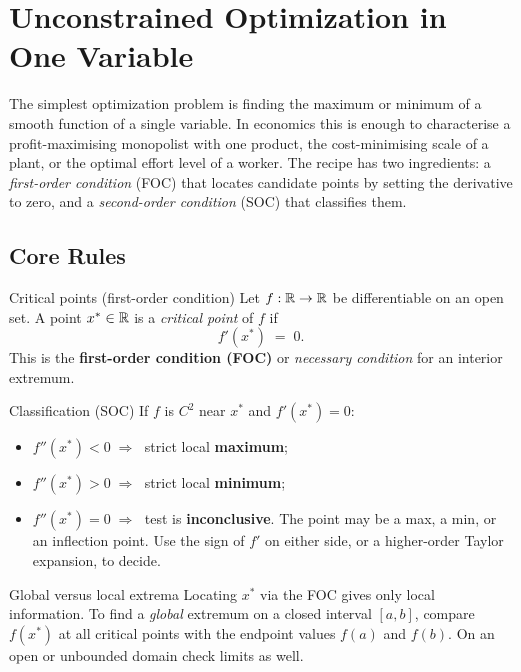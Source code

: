 \chapter{Unconstrained Optimization in One Variable}

The simplest optimization problem is finding the maximum or minimum of a
smooth function of a single variable. In economics this is enough to
characterise a profit-maximising monopolist with one product, the
cost-minimising scale of a plant, or the optimal effort level of a worker.
The recipe has two ingredients: a \emph{first-order condition} (FOC) that
locates candidate points by setting the derivative to zero, and a
\emph{second-order condition} (SOC) that classifies them.

\section{Core Rules}

\begin{rulebox}{Critical points (first-order condition)}
Let $f : \mathbb{R} \to \mathbb{R}$ be differentiable on an open set. A point
$x^* \in \mathbb{R}$ is a \emph{critical point} of $f$ if
\[
f'(x^*) \;=\; 0.
\]
This is the \textbf{first-order condition (FOC)} or \emph{necessary
condition} for an interior extremum.
\end{rulebox}

\begin{rulebox}{Classification (SOC)}
If $f$ is $C^2$ near $x^*$ and $f'(x^*) = 0$:
\begin{itemize}[leftmargin=1.6em,itemsep=0.3ex]
    \item $f''(x^*) < 0 \;\Rightarrow\;$ strict local \textbf{maximum};
    \item $f''(x^*) > 0 \;\Rightarrow\;$ strict local \textbf{minimum};
    \item $f''(x^*) = 0 \;\Rightarrow\;$ test is \textbf{inconclusive}. The
          point may be a max, a min, or an inflection point. Use the sign of
          $f'$ on either side, or a higher-order Taylor expansion, to
          decide.
\end{itemize}
\end{rulebox}

\begin{rulebox}{Global versus local extrema}
Locating $x^*$ via the FOC gives only local information. To find a
\emph{global} extremum on a closed interval $[a,b]$, compare $f(x^*)$ at
all critical points with the endpoint values $f(a)$ and $f(b)$. On an open
or unbounded domain check limits as well.
\end{rulebox}

